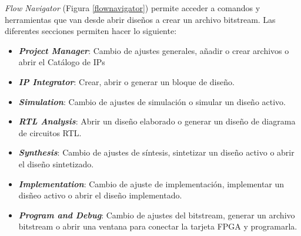 

\textit{Flow Navigator} (Figura \ref{flownavigator}) permite acceder a comandos y herramientas que van desde abrir diseños a crear un archivo bitstream. Las 
diferentes secciones permiten hacer lo siguiente:
\begin{itemize}
    \item \textit{\textbf{Project Manager}}: Cambio de ajustes generales, añadir o crear archivos o abrir el Catálogo de IPs
    \item \textit{\textbf{IP Integrator}}: Crear, abrir o generar un bloque de diseño. 
    \item \textit{\textbf{Simulation}}: Cambio de ajustes de simulación o simular un diseño activo.
    \item \textit{\textbf{RTL Analysis}}: Abrir un diseño elaborado o generar un diseño de diagrama de circuitos RTL.
    \item \textit{\textbf{Synthesis}}: Cambio de ajustes de síntesis, sintetizar un diseño activo o abrir el diseño sintetizado.
    \item \textit{\textbf{Implementation}}: Cambio de ajuste de implementación, implementar un disñeo activo o abrir el diseño implementado.
    \item \textit{\textbf{Program and Debug}}: Cambio de ajustes del bitstream, generar un archivo bitstream o abrir una ventana para 
    conectar la tarjeta FPGA y programarla.
\end{itemize}

